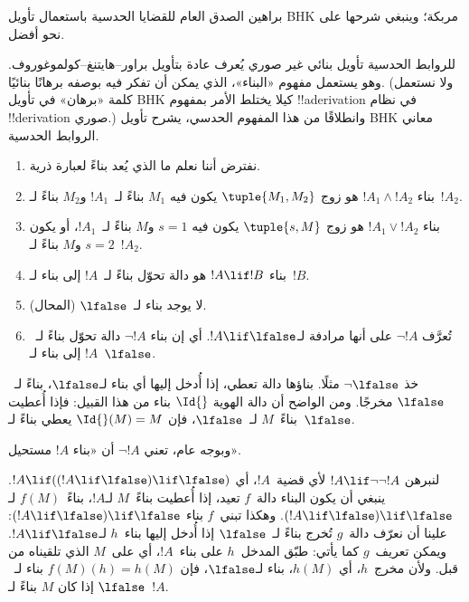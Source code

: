 \documentclass[../../../include/open-logic-section]{subfiles}
\begin{document}


\begin{editorial}
  براهين الصدق العام للقضايا الحدسية باستعمال تأويل BHK مربكة؛ وينبغي
  شرحها على نحو أفضل.
\end{editorial}

للروابط الحدسية تأويل بنائي غير صوري يُعرف عادة بتأويل
براور--هايتنغ--كولموغوروف. وهو يستعمل مفهوم «البناء»، الذي يمكن أن
تفكر فيه بوصفه برهانًا بنائيًا. (ولا نستعمل كلمة «برهان» في تأويل BHK
كيلا يختلط الأمر بمفهوم !!a{derivation} في نظام !!{derivation} صوري.)
وانطلاقًا من هذا المفهوم الحدسي، يشرح تأويل BHK معاني الروابط الحدسية.

\begin{enumerate}
\item نفترض أننا نعلم ما الذي يُعد بناءً لعبارة ذرية.
\item بناء $!A_1 \land !A_2$ هو زوج $\tuple{M_1, M_2}$ يكون فيه
  $M_1$ بناءً لـ~$!A_1$ و$M_2$ بناءً لـ~$!A_2$.
\item بناء $!A_1 \lor !A_2$ هو زوج $\tuple{s, M}$ يكون فيه $s=1$
  و$M$ بناءً لـ~$!A_1$، أو يكون $s=2$ و$M$ بناءً لـ~$!A_2$.
\item بناء $!A \lif !B$ هو دالة تحوّل بناءً لـ~$!A$ إلى بناء لـ~$!B$.
\item لا يوجد بناء لـ~$\lfalse$ (المحال).
\item تُعرَّف $\lnot !A$ على أنها مرادفة لـ$!A \lif \lfalse$. أي إن
  بناء $\lnot !A$ دالة تحوّل بناءً لـ~$!A$ إلى بناء لـ~$\lfalse$.
\end{enumerate}

\begin{ex}
خذ $\lnot \lfalse$ مثلًا. بناؤها دالة تعطي، إذا أُدخل إليها أي بناء
لـ$\lfalse$، بناءً لـ~$\lfalse$ مخرجًا. ومن الواضح أن دالة الهوية
$\Id{}$ بناء من هذا القبيل: فإذا أُعطيت بناءً~$M$ لـ~$\lfalse$، فإن
$\Id{}(M) = M$ يعطي بناءً لـ~$\lfalse$.
\end{ex}

وبوجه عام، تعني $\lnot !A$ أن «بناء $!A$ مستحيل».

\begin{ex}
لنبرهن $!A \lif \lnot \lnot !A$ لأي قضية~$!A$، أي
$!A \lif ((!A \lif \lfalse) \lif \lfalse)$. ينبغي أن يكون البناء
دالة~$f$ تعيد، إذا أُعطيت بناءً~$M$ لـ$!A$، بناءً~$f(M)$ لـ
$(!A \lif \lfalse) \lif \lfalse$. وهكذا تبني~$f$ بناء
$(!A \lif \lfalse) \lif \lfalse$: علينا أن نعرّف دالة~$g$ تُخرج بناءً
لـ~$\lfalse$ إذا أُدخل إليها بناء~$h$ لـ$!A \lif \lfalse$. ويمكن
تعريف~$g$ كما يأتي: طبّق المدخل~$h$ على بناء~$!A$، أي على~$M$ الذي
تلقيناه من قبل. ولأن مخرج~$h$، أي $h(M)$، بناء لـ$\lfalse$، فإن
$f(M)(h) = h(M)$ بناء لـ~$\lfalse$ إذا كان $M$ بناءً لـ~$!A$.
\end{ex}
\end{document}
